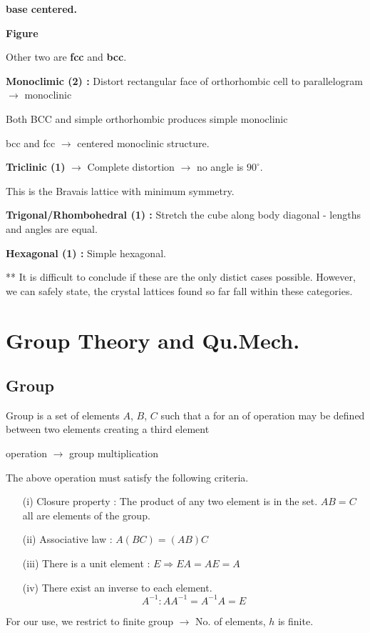 \noindent
{\bf base centered.}
\begin{center}
{\bf Figure}
\end{center}
Other two are {\bf fcc} and {\bf bcc}.

\medskip
\noindent
{\bf Monoclimic (2) :} Distort rectangular face of orthorhombic cell to parallelogram $\to$ monoclinic

Both BCC and simple orthorhombic produces simple monoclinic

bcc and fcc $\to$ centered monoclinic structure.

\noindent
{\bf Triclinic (1)} $\to$ Complete distortion $\to$ no angle is $90^{\circ}$.

This is the Bravais lattice with minimum symmetry.

\noindent
{\bf Trigonal/Rhombohedral (1) :} Stretch the cube along body diagonal - lengths and angles are equal.

\noindent
{\bf Hexagonal (1) :} Simple hexagonal.

** It is difficult to conclude if these are the only distict cases possible. However, we can safely state, the crystal lattices found so far fall within these categories.

\section*{Group Theory and Qu.Mech.}

\subsection*{Group}

Group is a set of elements $A$, $B$, $C$ such that a for an of operation may be defined between two elements creating a third element
\begin{center}
operation $\to$ group multiplication
\end{center}
The above operation must satisfy the following criteria.
\begin{itemize}
\item[(i)] Closure property : The product of any two element is in the set. $AB=C$ all are elements of the group.

\item[(ii)] Associative law : $A(BC)=(AB)C$

\item[(iii)] There is a unit element : $E\Rightarrow EA=AE=A$

\item[(iv)] There exist an inverse to each element.
$$
A^{-1}:AA^{-1}=A^{-1}A=E
$$
\end{itemize}
For our use, we restrict to finite group $\to$ No. of elements, $h$ is finite.

